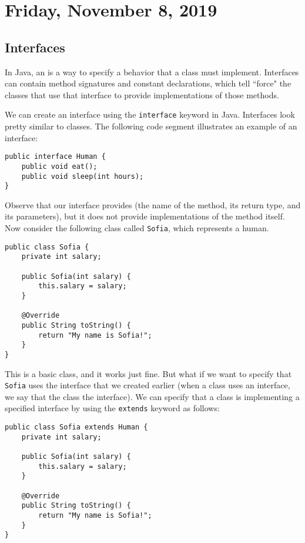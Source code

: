 \section{Friday, November 8, 2019}

\subsection{Interfaces}

In Java, an  is a way to specify a behavior that a class must implement. Interfaces can contain method signatures and constant declarations, which tell ``force" the classes that use that interface to provide implementations of those methods. 

We can create an interface using the \verb!interface! keyword in Java. Interfaces look pretty similar to classes. The following code segment illustrates an example of an interface:


\begin{lstlisting}
public interface Human {
    public void eat();
    public void sleep(int hours);
}
\end{lstlisting}

Observe that our interface provides  (the name of the method, its return type, and its parameters), but it does not provide implementations of the method itself. Now consider the following class called \verb!Sofia!, which represents a human. 

\begin{lstlisting}
public class Sofia {
    private int salary;
    
    public Sofia(int salary) {
        this.salary = salary;
    }
    
    @Override
    public String toString() {
        return "My name is Sofia!";
    }
}
\end{lstlisting}

This is a basic class, and it works just fine. But what if we want to specify that \verb!Sofia! uses the interface that we created earlier (when a class uses an interface, we say that the class  the interface). We can specify that a class is implementing a specified interface by using the \verb!extends! keyword as follows:


\begin{lstlisting}
public class Sofia extends Human {
    private int salary;
    
    public Sofia(int salary) {
        this.salary = salary;
    }
    
    @Override
    public String toString() {
        return "My name is Sofia!";
    }
}
\end{lstlisting}

